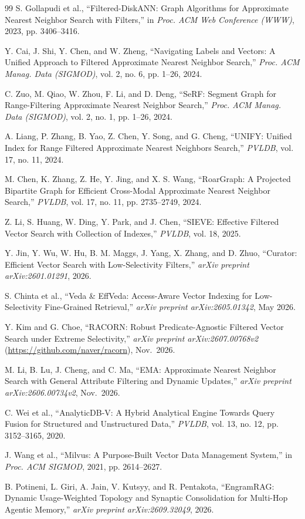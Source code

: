 \documentclass[conference]{IEEEtran}
\begin{document}
\begin{thebibliography}{99}
S. Gollapudi et al., ``Filtered-DiskANN: Graph Algorithms for Approximate Nearest Neighbor Search with Filters,'' in \textit{Proc. ACM Web Conference (WWW)}, 2023, pp. 3406--3416.

Y. Cai, J. Shi, Y. Chen, and W. Zheng, ``Navigating Labels and Vectors: A Unified Approach to Filtered Approximate Nearest Neighbor Search,'' \textit{Proc. ACM Manag. Data (SIGMOD)}, vol. 2, no. 6, pp. 1--26, 2024.

C. Zuo, M. Qiao, W. Zhou, F. Li, and D. Deng, ``SeRF: Segment Graph for Range-Filtering Approximate Nearest Neighbor Search,'' \textit{Proc. ACM Manag. Data (SIGMOD)}, vol. 2, no. 1, pp. 1--26, 2024.

A. Liang, P. Zhang, B. Yao, Z. Chen, Y. Song, and G. Cheng, ``UNIFY: Unified Index for Range Filtered Approximate Nearest Neighbors Search,'' \textit{PVLDB}, vol. 17, no. 11, 2024.

M. Chen, K. Zhang, Z. He, Y. Jing, and X. S. Wang, ``RoarGraph: A Projected Bipartite Graph for Efficient Cross-Modal Approximate Nearest Neighbor Search,'' \textit{PVLDB}, vol. 17, no. 11, pp. 2735--2749, 2024.

Z. Li, S. Huang, W. Ding, Y. Park, and J. Chen, ``SIEVE: Effective Filtered Vector Search with Collection of Indexes,'' \textit{PVLDB}, vol. 18, 2025.

Y. Jin, Y. Wu, W. Hu, B. M. Maggs, J. Yang, X. Zhang, and D. Zhuo, ``Curator: Efficient Vector Search with Low-Selectivity Filters,'' \textit{arXiv preprint arXiv:2601.01291}, 2026.

S. Chinta et al., ``Veda \& EffVeda: Access-Aware Vector Indexing for Low-Selectivity Fine-Grained Retrieval,'' \textit{arXiv preprint arXiv:2605.01342}, May 2026.

Y. Kim and G. Choe, ``RACORN: Robust Predicate-Agnostic Filtered Vector Search under Extreme Selectivity,'' \textit{arXiv preprint arXiv:2607.00768v2} (\url{https://github.com/naver/racorn}), Nov.\ 2026.

M. Li, B. Lu, J. Cheng, and C. Ma, ``EMA: Approximate Nearest Neighbor Search with General Attribute Filtering and Dynamic Updates,'' \textit{arXiv preprint arXiv:2606.00734v2}, Nov.\ 2026.

C. Wei et al., ``AnalyticDB-V: A Hybrid Analytical Engine Towards Query Fusion for Structured and Unstructured Data,'' \textit{PVLDB}, vol. 13, no. 12, pp. 3152--3165, 2020.

J. Wang et al., ``Milvus: A Purpose-Built Vector Data Management System,'' in \textit{Proc. ACM SIGMOD}, 2021, pp. 2614--2627.

B. Potineni, L. Giri, A. Jain, V. Kutsyy, and R. Pentakota, ``EngramRAG: Dynamic Usage-Weighted Topology and Synaptic Consolidation for Multi-Hop Agentic Memory,'' \textit{arXiv preprint arXiv:2609.32049}, 2026.

\end{thebibliography}
\end{document}
